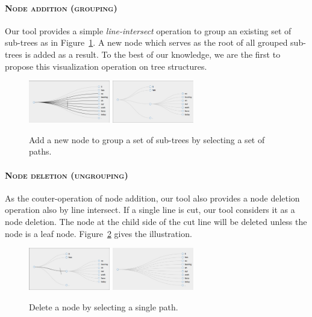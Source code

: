 \paragraph{\textsc{Node addition (grouping)}\\}

Our tool provides a simple {\em line-intersect} operation to group an
existing set of sub-trees as in Figure~\ref{fig:new_node.png}. A new
node which serves as the root of all grouped sub-trees is added as a
result. To the best of our knowledge, we are the first to propose this
visualization operation on tree structures. 

\begin{figure}
\centering
\includegraphics[width=1.4in]{figs/new_node_before.png}
\includegraphics[width=1.4in]{figs/new_node_result.png}
\caption{Add a new node to group a set of sub-trees by selecting a set
of paths.}
\label{fig:new_node.png}
\end{figure}


\paragraph{\textsc{Node deletion (ungrouping)}\\}

As the couter-operation of node addition, our tool also provides a
node deletion operation also by line intersect. If a single line is
cut, our tool considers it as a node deletion. The node at the child
side of the cut line will be deleted unless the node is a leaf node.
Figure~\ref{fig:node_deletion.png} gives the illustration.

\begin{figure}
\centering
\includegraphics[width=1.4in]{figs/node_deletion_before.png}
\includegraphics[width=1.4in]{figs/node_deletion_after.png}
\caption{Delete a node by selecting a single path.}
\label{fig:node_deletion.png}
\end{figure}



